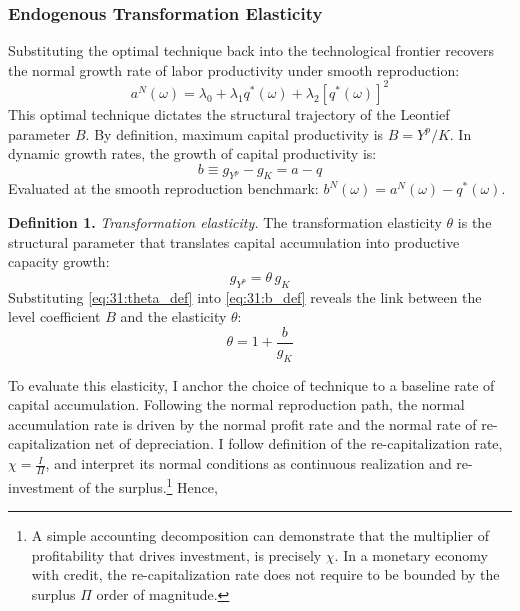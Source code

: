 \subsubsection{Endogenous Transformation Elasticity}

Substituting the optimal technique back into the
technological frontier recovers the normal growth rate of
labor productivity under smooth reproduction:
\begin{equation}
	a^N(\omega) = \lambda_0 + \lambda_1 q^*(\omega)
	+ \lambda_2 \left[ q^*(\omega) \right]^2
	\label{eq:31:aN}
\end{equation}
This optimal technique dictates the structural trajectory of
the Leontief parameter $B$. By definition, maximum capital
productivity is $B = Y^p / K$. In dynamic growth rates, the
growth of capital productivity is:
\begin{equation}
	b \equiv g_{Y^p} - g_K = a - q
	\label{eq:31:b_def}
\end{equation}
Evaluated at the smooth reproduction benchmark:
$b^N(\omega) = a^N(\omega) - q^*(\omega)$.

\textbf{Definition 1.} \textit{Transformation elasticity.}
The transformation elasticity $\theta$ is the structural
parameter that translates capital accumulation into productive
capacity growth:
\begin{equation}
	g_{Y^p} = \theta\, g_K
	\label{eq:31:theta_def}
\end{equation}
Substituting \eqref{eq:31:theta_def} into
\eqref{eq:31:b_def} reveals the link between the level
coefficient $B$ and the elasticity $\theta$:
\begin{equation}
	\theta = 1 + \frac{b}{g_K}
	\label{eq:31:theta_link}
\end{equation}

To evaluate this elasticity, I anchor the choice of technique
to a baseline rate of capital accumulation. Following the
normal reproduction path, the normal accumulation rate is
driven by the normal profit rate and the normal rate of re-capitalization  net of depreciation. I follow \citet{Foley1986} definition of the re-capitalization rate, $\chi=\frac{I}{\Pi}$, and interpret its normal conditions as continuous realization and re-investment of the surplus.\footnote{A simple accounting decomposition can demonstrate that the multiplier of profitability that drives investment, is precisely $\chi$. In a monetary economy with credit, the re-capitalization rate does not require to be bounded by the surplus $\Pi$ order of magnitude.} Hence, 

